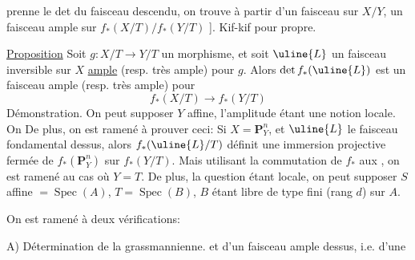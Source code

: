 prenne le det du faisceau descendu, on trouve à partir d'un faisceau  sur $X/Y$, un faisceau ample sur $f_*(X/T)/f_*(Y/T)$ ]. Kif-kif pour propre.

\uline{Proposition} Soit $g:X/T\longrightarrow Y/T$ un morphisme, et soit $\uline{L}$ un faisceau inversible sur $X$ \uline{ample}  (resp. très ample) pour $g$. Alors $\det f_*(\uline{L})$ est un faisceau ample (resp. très ample) pour
\[
f_*(X/T)\longrightarrow f_*(Y/T)
\]
Démonstration.  On peut supposer $Y$ affine, l'amplitude  étant une notion locale.  On    De plus, on est ramené à prouver ceci: Si $X=\mathbf P_Y^n$, et $\uline{L}$ le faisceau fondamental dessus, alors $f_*(\uline{L}/T)$  définit une immersion projective fermée de $f_*(\mathbf P_Y^n)$ sur  $f_*(Y/T)$. Mais utilisant la commutation de $f_*$ aux , on est ramené au cas où $Y=T$. De plus, la question étant locale, on peut supposer $S$ affine $=\operatorname{Spec}(A)$, $T=\operatorname{Spec}(B)$, $B$ étant libre de type fini (rang $d$) sur $A$.

On est ramené  à deux vérifications:

A) Détermination de la grassmannienne.
et d'un faisceau ample dessus, i.e. d'une 
